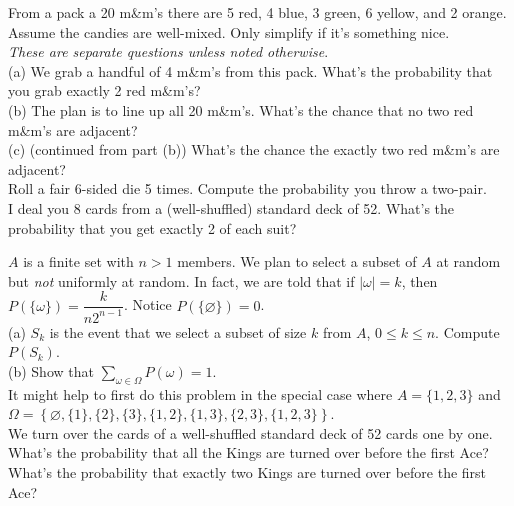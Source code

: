 \documentclass[12pt]{article}
\begin{document}
 From a pack a 20 m\&m's there are 5 red, 4 blue, 3 green, 6 yellow, and 2 orange.  Assume the candies are well-mixed.  Only simplify if it's something nice.\\
{\em These are separate questions unless noted otherwise}.\\
(a) We grab a handful of 4 m\&m's from this pack.  What's the probability that you grab exactly 2 red m\&m's?\\
(b) The plan is to line up all 20 m\&m's.  What's the chance that no two red m\&m's are adjacent?\\
(c) (continued from part (b)) What's the chance the exactly two red m\&m's are adjacent?\\

 Roll a fair 6-sided die 5 times. Compute the probability you throw a two-pair.\\

 I deal you 8 cards from a (well-shuffled) standard deck of 52. What's the probability that you get exactly 2 of each suit?\\



\medskip

 $A$ is a finite set with $n>1$ members.  We plan to select a subset of $A$ at random but {\em not} uniformly at random.
In fact, we are told that if $|\omega|=k$, then $P(\{\omega\}) = \dfrac k{n2^{n-1}}$.  Notice $P(\{\varnothing\})=0$.\\
(a) $S_k$ is the event that we select a subset of size $k$ from $A$, $0\le k\le n$.  Compute $P(S_k)$.\\
(b) Show that $\displaystyle \sum_{\omega\in \Omega} P(\omega)= 1$.\\


 It might help to first do this problem in the special case where $A=\{1,2,3\}$ and
$\Omega = \left\{ \varnothing, \{1\},\{2\},\{3\},\{1,2\},\{1,3\},\{2,3\},\{1,2,3\}\right\}$.\\

 We turn over the cards of a well-shuffled
standard deck of 52 cards one by one. What's the probability that
all the Kings are turned over before the first Ace?  What's the probability that exactly two
Kings are turned over before the first Ace?\\
\end{document}
